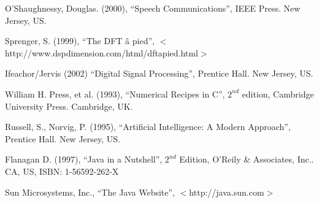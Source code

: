 

\begin{thebibliography}{99}




O'Shaughnessy, Douglas. (2000),
         ``Speech Communications'', IEEE Press. New Jersey, US.

Sprenger, S.  (1999),
	``The DFT \^{a} pied'', $<$http://www.dspdimension.com/html/dftapied.html$>$

 Ifeachor/Jervis (2002)
	``Digital Signal Processing'', Prentice Hall. New Jersey, US.

William H. Press, et al. (1993),
	``Numerical Recipes in C'', $2^{nd}$ edition, Cambridge University Press.  Cambridge, UK.

Russell, S., Norvig, P. (1995),
	``Artificial Intelligence: A Modern Approach'', Prentice Hall.  New Jersey, US.

Flanagan D. (1997),
	``Java in a Nutshell'', $2^{nd}$ Edition, O'Reily \& Associates, Inc..  CA, US, ISBN: 1-56592-262-X

 Sun Microsystems, Inc.,
    ``The Java Website'', $<$http://java.sun.com$>$

\end{thebibliography}
